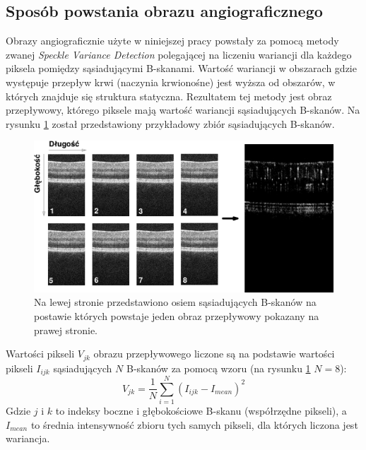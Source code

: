 \subsection{Sposób powstania obrazu angiograficznego}

Obrazy angiograficznie użyte w niniejszej pracy powstały za pomocą metody zwanej \textit{Speckle Variance Detection} polegającej na liczeniu wariancji dla każdego piksela pomiędzy sąsiadującymi B-skanami. Wartość wariancji w obszarach gdzie występuje przepływ krwi (naczynia krwionośne) jest wyższa od obszarów, w których znajduje się struktura statyczna. Rezultatem tej metody jest obraz przepływowy, którego piksele mają wartość wariancji sąsiadujących B-skanów. Na rysunku \ref{fig:obrazowanie_oct:speckle_variance} został przedstawiony przykładowy zbiór sąsiadujących B-skanów.

\begin{figure}[H]
	\centering
	\includegraphics[width=\textwidth]{gfx/speckle_variance}
	\caption{Na lewej stronie przedstawiono osiem sąsiadujących B-skanów na postawie których powstaje jeden obraz przepływowy pokazany na prawej stronie.}
	\label{fig:obrazowanie_oct:speckle_variance}
\end{figure}

Wartości pikseli $V_{jk}$ obrazu przepływowego liczone są na podstawie wartości pikseli $I_{ijk}$ sąsiadujących $N$ B-skanów za pomocą wzoru (na rysunku \ref{fig:obrazowanie_oct:speckle_variance} $N=8$):
\begin{equation}
V_{jk} = \frac{1}{N} \displaystyle\sum_{i=1}^{N}(I_{ijk} - I_{mean})^2
\end{equation}
Gdzie $j$ i $k$ to indeksy boczne i głębokościowe B-skanu (współrzędne pikseli), a $I_{mean}$ to średnia intensywność zbioru tych samych pikseli, dla których liczona jest wariancja.

